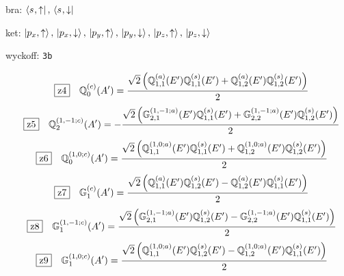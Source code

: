 \documentclass[fleqn,10pt,landscape]{jsarticle}
\begin{document}
\noindent\quad * bra: $\bra{s_{},\uparrow},\, \bra{s_{},\downarrow}$

\noindent\quad * ket: $\ket{p_{x},\uparrow},\, \ket{p_{x},\downarrow},\, \ket{p_{y},\uparrow},\, \ket{p_{y},\downarrow},\, \ket{p_{z},\uparrow},\, \ket{p_{z},\downarrow}$

\noindent\quad * wyckoff: \texttt{3b}

\begin{dmath*}
\hspace*{3mm}\fbox{z4}\quad \mathbb{Q}_{0}^{(c)}(A^{\prime})=\frac{\sqrt{2} \left(\mathbb{Q}_{1,1}^{(a)}(E^{\prime}) \mathbb{Q}_{1,1}^{(s)}(E^{\prime}) + \mathbb{Q}_{1,2}^{(a)}(E^{\prime}) \mathbb{Q}_{1,2}^{(s)}(E^{\prime})\right)}{2}
\end{dmath*}
\begin{dmath*}
\hspace*{3mm}\fbox{z5}\quad \mathbb{Q}_{2}^{(1,-1;c)}(A^{\prime})=- \frac{\sqrt{2} \left(\mathbb{G}_{2,1}^{(1,-1;a)}(E^{\prime}) \mathbb{Q}_{1,1}^{(s)}(E^{\prime}) + \mathbb{G}_{2,2}^{(1,-1;a)}(E^{\prime}) \mathbb{Q}_{1,2}^{(s)}(E^{\prime})\right)}{2}
\end{dmath*}
\begin{dmath*}
\hspace*{3mm}\fbox{z6}\quad \mathbb{Q}_{0}^{(1,0;c)}(A^{\prime})=\frac{\sqrt{2} \left(\mathbb{Q}_{1,1}^{(1,0;a)}(E^{\prime}) \mathbb{Q}_{1,1}^{(s)}(E^{\prime}) + \mathbb{Q}_{1,2}^{(1,0;a)}(E^{\prime}) \mathbb{Q}_{1,2}^{(s)}(E^{\prime})\right)}{2}
\end{dmath*}
\begin{dmath*}
\hspace*{3mm}\fbox{z7}\quad \mathbb{G}_{1}^{(c)}(A^{\prime})=\frac{\sqrt{2} \left(\mathbb{Q}_{1,1}^{(a)}(E^{\prime}) \mathbb{Q}_{1,2}^{(s)}(E^{\prime}) - \mathbb{Q}_{1,2}^{(a)}(E^{\prime}) \mathbb{Q}_{1,1}^{(s)}(E^{\prime})\right)}{2}
\end{dmath*}
\begin{dmath*}
\hspace*{3mm}\fbox{z8}\quad \mathbb{G}_{1}^{(1,-1;c)}(A^{\prime})=\frac{\sqrt{2} \left(\mathbb{G}_{2,1}^{(1,-1;a)}(E^{\prime}) \mathbb{Q}_{1,2}^{(s)}(E^{\prime}) - \mathbb{G}_{2,2}^{(1,-1;a)}(E^{\prime}) \mathbb{Q}_{1,1}^{(s)}(E^{\prime})\right)}{2}
\end{dmath*}
\begin{dmath*}
\hspace*{3mm}\fbox{z9}\quad \mathbb{G}_{1}^{(1,0;c)}(A^{\prime})=\frac{\sqrt{2} \left(\mathbb{Q}_{1,1}^{(1,0;a)}(E^{\prime}) \mathbb{Q}_{1,2}^{(s)}(E^{\prime}) - \mathbb{Q}_{1,2}^{(1,0;a)}(E^{\prime}) \mathbb{Q}_{1,1}^{(s)}(E^{\prime})\right)}{2}
\end{dmath*}
\end{document}
